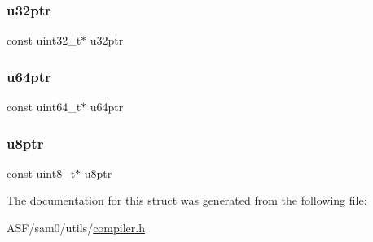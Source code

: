 \subsubsection{\texorpdfstring{u32ptr}{u32ptr}}
{\footnotesize\ttfamily const uint32\+\_\+t$\ast$ u32ptr}

\mbox{\label{struct_struct_c_ptr_abbc67642e882a52be564515f1c8f12cb}} 
\subsubsection{\texorpdfstring{u64ptr}{u64ptr}}
{\footnotesize\ttfamily const uint64\+\_\+t$\ast$ u64ptr}

\mbox{\label{struct_struct_c_ptr_acb08e5689c70ca4ef5e0d984f15f47ae}} 
\subsubsection{\texorpdfstring{u8ptr}{u8ptr}}
{\footnotesize\ttfamily const uint8\+\_\+t$\ast$ u8ptr}



The documentation for this struct was generated from the following file\+:\begin{DoxyCompactItemize}
\item 
A\+S\+F/sam0/utils/\mbox{\hyperlink{compiler_8h}{compiler.\+h}}\end{DoxyCompactItemize}
